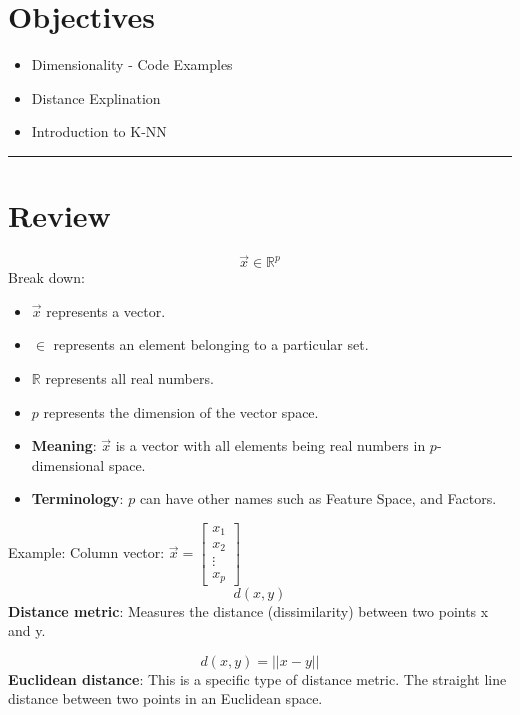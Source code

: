 \section*{Objectives}
\begin{itemize}
  \item Dimensionality - Code Examples
  \item Distance Explination
  \item Introduction to K-NN
  \end{itemize}

\rule[0.0051in]{\textwidth}{0.00025in}

\section{Review}
\[
\vec{x} \in {\mathbb{R}}^p
\]
Break down: 
\begin{itemize}
    \item $\vec{x}$ represents a vector. 
    \item $\in$ represents an element belonging to a particular set. 
    \item $\mathbb{R}$ represents all real numbers. 
    \item $p$ represents the dimension of the vector space. 
    \item \textbf{Meaning}: $\vec{x}$ is a vector with all elements being real numbers in $p$-dimensional space. 
    \item \textbf{Terminology}: $p$ can have other names such as Feature Space, and Factors.
\end{itemize}

Example: Column vector:
$\vec{x} = \begin{bmatrix}
x_1 \\
x_2 \\
\vdots \\
x_p
\end{bmatrix}$ \\

\[
    d(x,y)
\]
\textbf{Distance metric}: Measures the distance (dissimilarity) between two points x and y. 

\[
    d(x,y) = ||x-y||
\]
\textbf{Euclidean distance}: This is a specific type of distance metric. The straight line distance between two points in an Euclidean space. 


